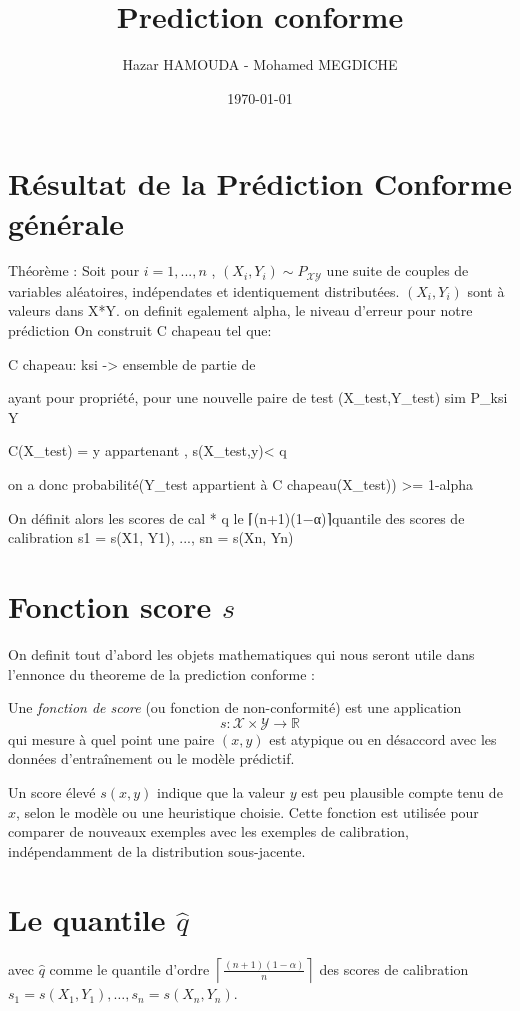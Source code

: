 \documentclass[a4paper,12pt]{article}%
\title{Prediction conforme}
\author{Hazar HAMOUDA - Mohamed MEGDICHE}
\date{\today}
\begin{document}
\maketitle

\section{Résultat de la Prédiction Conforme générale}
Théorème : Soit pour $i= 1,...,n$ ,  
 $(X_i, Y_i) \sim P_{\mathcal{X}\mathcal{Y}}$ une suite de couples de variables aléatoires, indépendates et identiquement distributées. $(X_i, Y_i)$ sont à valeurs dans X*Y. on definit egalement alpha, le niveau d'erreur pour notre prédiction
 On construit C chapeau tel que:
 
 
 C chapeau: ksi -> ensemble de partie de 

 ayant pour propriété, pour une nouvelle paire de test (X_test,Y_test) sim P_ksi Y

 C(X_test) = {y appartenant , s(X_test,y)< q}
 
 

 on a donc 
 probabilité({Y_test appartient à C chapeau(X_test)}) >= 1-alpha


 
 On définit alors les scores de cal
 * q le ⌈(n+1)(1−α)⌉quantile des scores de calibration s1 = s(X1, Y1), ..., sn = s(Xn, Yn)

\section{Fonction score $s$} 


On definit tout d'abord les objets mathematiques qui  nous seront utile dans l'ennonce du theoreme de la prediction conforme : 

Une \emph{fonction de score} (ou fonction de non-conformité) est une application
\[
s : \mathcal{X} \times \mathcal{Y} \rightarrow \mathbb{R}
\]
qui mesure à quel point une paire $(x, y)$ est atypique ou en désaccord avec les données d'entraînement ou le modèle prédictif.

Un score élevé $s(x, y)$ indique que la valeur $y$ est peu plausible compte tenu de $x$, selon le modèle ou une heuristique choisie. Cette fonction est utilisée pour comparer de nouveaux exemples avec les exemples de calibration, indépendamment de la distribution sous-jacente.
\section{ Le quantile $\hat{q}$}
     avec $\hat{q}$ comme le quantile d'ordre $\left\lceil \frac{(n+1)(1 - \alpha)}{n} \right\rceil$ des scores de calibration $s_1 = s(X_1, Y_1), \dots, s_n = s(X_n, Y_n)$.
\end{document}
